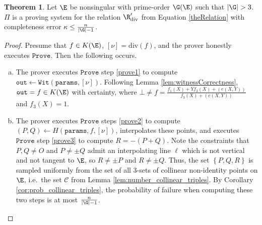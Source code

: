\documentclass[11pt,letterpaper]{article}
\newcommand{\free}[1]{{\textcolor{red}{#1}}}
\theoremstyle{definition}
\newtheorem{theorem}{Theorem}[subsection]
\newcommand{\6}{\mathbf}
\newcommand{\7}{\mathcal}
\begin{document}
\begin{theorem}\label{thm:DivisorCompleteness}
Let $\E$ be nonsingular with prime-order $\G(\E)$ such that $\left|\G\right| > 3$. $\Pi$ is a proving system for the relation $\R_{\text{div}}^\prime$ from Equation \ref{theRelation} with completeness error $\kappa \leq \frac{n}{\left|\G\right|-1}$.
\end{theorem}
\begin{proof}
Presume that $f \in K(\E)$, $[\nu] = \text{div}(f)$, and the prover honestly executes $\texttt{Prove}$. Then the following occurs.
\begin{enumerate}[(a)]
\item The prover executes $\texttt{Prove}$ step \ref{prove1} to compute $\texttt{out} \leftarrow \texttt{Wit}(\texttt{params},[\nu])$. Following Lemma \ref{lem:witnessCorrectness}, $\texttt{out} = f \in K(\E)$ with certainty, where $\bot \neq f = \frac{f_1(X) + Yf_2(X) + (e(X,Y))}{f_3(X) + (e(X, Y))}$ and $f_3(X) = 1$.

\item The prover executes $\texttt{Prove}$ steps \ref{prove2} to compute $(P,Q) \leftarrow H(\texttt{params}, f, [\nu])$, interpolates these points, and executes $\texttt{Prove}$ step \ref{prove3} to compute $R = -(P+Q)$. Note the constraints that $P, Q \neq O$ and $P \neq \pm Q$ admit an interpolating line $\ell$ which is not vertical and not tangent to $\E$, so $R \neq \pm P$ and $R \neq \pm Q$. Thus, the set $\left\{P,Q,R\right\}$ is sampled uniformly from the set of all $3$-sets of  collinear non-identity points on $\E$, i.e.\ the set $\mathcal{C}$ from Lemma \ref{lem:number_collinear_triples}. By Corollary \ref{cor:prob_collinear_triples}, the probability of failure when computing these two steps is at most $\frac{n}{\left|\G\right|-1}$. 



\end{enumerate}
\end{proof}
\end{document}
